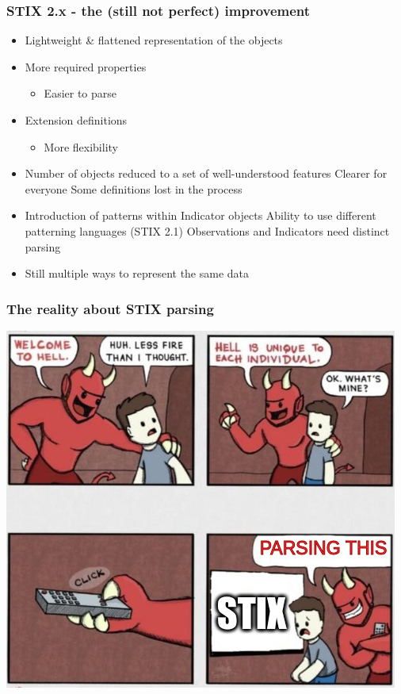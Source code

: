 \begin{frame}
    \frametitle{STIX 2.x - the (still not perfect) improvement}
    \begin{itemize}
        \item Lightweight \& flattened representation of the objects
        \item More required properties
        \begin{itemize}
            \item Easier to parse
        \end{itemize}
        \item Extension definitions
        \begin{itemize}
            \item More flexibility
        \end{itemize}
        \item Number of objects reduced to a set of well-understood features
        \linebreak \faPlusCircle \hspace{0.3em} Clearer for everyone
        \linebreak \faMinusCircle \hspace{0.3em} Some definitions lost in the process
        \item Introduction of patterns within Indicator objects
        \linebreak \faPlusCircle \hspace{0.3em} Ability to use different patterning languages (STIX 2.1)
        \linebreak \faMinusCircle \hspace{0.3em} Observations and Indicators need distinct parsing
        \item Still multiple ways to represent the same data
    \end{itemize}
\end{frame}

\begin{frame}
    \frametitle{The reality about STIX parsing}
    \centering
    \includegraphics[scale=0.45]{images/hell.png}
\end{frame}

